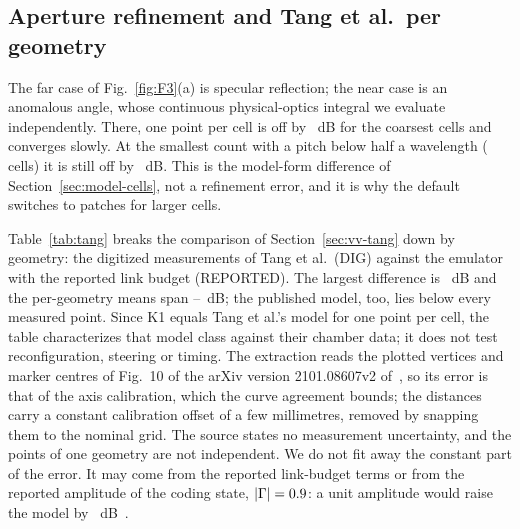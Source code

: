 \subsection{Aperture refinement and Tang et al.\ per geometry}\label{app:tang}
The far case of Fig.~\ref{fig:F3}(a) is specular reflection; the near case is
an anomalous angle, whose continuous physical-optics integral we evaluate independently.
There, one point per cell is off by
\numRefinePointCoarseDb~dB for the coarsest cells and converges slowly. At the smallest count
with a pitch below half a wavelength (\numRefinePointFirstAutoN{} cells) it is still off by
\numRefinePointFirstAutoDb~dB. This is the model-form difference of
Section~\ref{sec:model-cells}, not a refinement error, and it is why the default switches to
patches for larger cells.


Table~\ref{tab:tang} breaks the comparison of Section~\ref{sec:vv-tang} down
by geometry: the digitized measurements of Tang et al.\ (DIG) against the emulator with the
reported link budget (REPORTED). The largest difference is \numTangMeasMaxDb~dB and the
per-geometry means span \numTangPanelBiasMinDb--\numTangPanelBiasMaxDb~dB; the published model,
too, lies below every measured point. Since K1 equals Tang et al.'s model for one point per
cell, the table characterizes that model class against their chamber data; it does not test
reconfiguration, steering or timing. The extraction reads the plotted vertices and marker
centres of Fig.~10 of the arXiv version 2101.08607v2 of~\cite{Tang2022mmWave}, so its error is
that of the axis calibration, which the curve agreement bounds; the distances carry a constant
calibration offset of a few millimetres, removed by snapping them to the nominal grid. The
source states no measurement uncertainty, and the points of one geometry are not independent.
We do not fit away the constant part of the error. It may come from the reported link-budget
terms or from the reported amplitude of the coding state, $|\Gamma|=0.9$: a unit
amplitude would raise the model by \numTangGammaLossDb~dB~\cite{Tang2022mmWave}.

